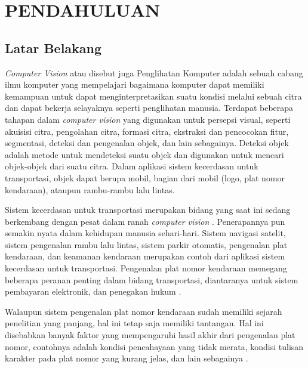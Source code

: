 \chapter{PENDAHULUAN}

\vspace{4.5pt}

\section{Latar Belakang} \label{sec:latar_belakang}
\noindent \textit{Computer Vision} atau disebut juga Penglihatan Komputer adalah sebuah cabang ilmu komputer yang mempelajari bagaimana komputer dapat memiliki kemampuan untuk dapat menginterpretasikan suatu kondisi melalui sebuah citra dan dapat bekerja selayaknya seperti penglihatan manusia. Terdapat beberapa tahapan dalam \textit{computer vision} yang digunakan untuk persepsi visual, seperti akuisisi citra, pengolahan citra, formasi citra, ekstraksi dan pencocokan fitur, segmentasi, deteksi dan pengenalan objek, dan lain sebagainya. Deteksi objek adalah metode untuk mendeteksi suatu objek dan digunakan untuk mencari objek-objek dari suatu citra. Dalam aplikasi sistem kecerdasan untuk transportasi, objek dapat berupa mobil, bagian dari mobil (logo, plat nomor kendaraan), ataupun rambu-rambu lalu lintas.

\noindent Sistem kecerdasan untuk transportasi merupakan bidang yang saat ini sedang berkembang dengan pesat dalam ranah \textit{computer vision} \cite{tabrizi}. Penerapannya pun semakin nyata dalam kehidupan manusia sehari-hari. Sistem navigasi satelit, sistem pengenalan rambu lalu lintas, sistem parkir otomatis, pengenalan plat kendaraan, dan keamanan kendaraan merupakan contoh dari aplikasi sistem kecerdasan untuk transportasi. Pengenalan plat nomor kendaraan memegang beberapa peranan penting dalam bidang transportasi, diantaranya untuk sistem pembayaran elektronik, dan penegakan hukum \cite{gou2014}.

\noindent Walaupun sistem pengenalan plat nomor kendaraan sudah memiliki sejarah penelitian yang panjang, hal ini tetap saja memiliki tantangan. Hal ini disebabkan banyak faktor yang mempengaruhi hasil akhir dari pengenalan plat nomor, contohnya adalah kondisi pencahayaan yang tidak merata, kondisi tulisan karakter pada plat nomor yang kurang jelas, dan lain sebagainya \cite{gou2014}.

